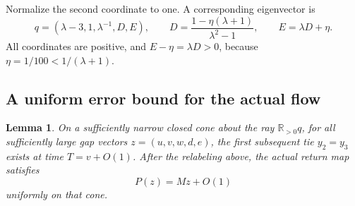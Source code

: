 \documentclass[11pt,a4paper]{article}
\numberwithin{equation}{section}
\newtheorem{lemma}[theorem]{Lemma}
\theoremstyle{definition}
\newcommand{\R}{\mathbb R}
\begin{document}
Normalize the second coordinate to one. A corresponding eigenvector is
\begin{equation}\label{eq:eigenvector}
 q=\left(\lambda-3,1,\lambda^{-1},D,E\right),\qquad
 D=\frac{1-\eta(\lambda+1)}{\lambda^2-1},\qquad
 E=\lambda D+\eta.
\end{equation}
All coordinates are positive, and \(E-\eta=\lambda D>0\), because
\(\eta=1/100<1/(\lambda+1)\).

\subsection{A uniform error bound for the actual flow}

\begin{lemma}\label{lem:return}
On a sufficiently narrow closed cone about the ray \(\R_{>0}q\),
for all sufficiently large gap vectors \(z=(u,v,w,d,e)\), the first
subsequent tie \(y_2=y_3\) exists at time \(T=v+O(1)\). After the
relabeling above, the actual return map satisfies
\begin{equation}\label{eq:return}
 P(z)=Mz+O(1)
\end{equation}
uniformly on that cone.
\end{lemma}
\end{document}

